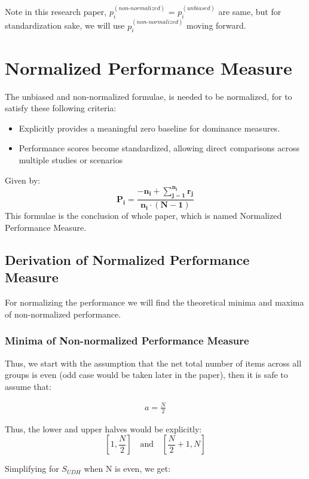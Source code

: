 \documentclass[man,floatsintext]{apa7}
\begin{document}
Note in this research paper, $p_i^{(non\text{-}normalized)}$ = $p_i^{(unbiased)}$ are same, but for standardization sake, we will use $p_i^{(non\text{-}normalized)}$ moving forward.

\section{Normalized Performance Measure}

The unbiased and non-normalized formulae, is needed to be normalized, for to satisfy these following criteria:
\begin{itemize}
	\item Explicitly provides a meaningful zero baseline for dominance measures.
	\item Performance scores become standardized, allowing direct comparisons across multiple studies or scenarios
\end{itemize}
Given by:
\begin{equation}
	\boxed{
		\mathbf{
			P_i = \frac{-n_i +  \sum\limits_{j=1}^{n_i} r_j}{n_i \cdot (N - 1)}}
	}
\end{equation}
This formulae is the conclusion of whole paper, which is named Normalized Performance Measure.

\subsection{Derivation of Normalized Performance Measure}

For normalizing the performance we will find the theoretical minima and maxima of non-normalized performance. 

\subsubsection{Minima of Non-normalized Performance Measure}

Thus, we start with the assumption that the net total number of items across all groups is even (odd case would be taken later in the paper), then it is safe to assume that:

\begin{align*}
	a = \frac{N}{2}
\end{align*}

Thus, the lower and upper halves would be explicitly:
\[
\left[1, \frac{N}{2}\right] \quad \text{and} \quad \left[\frac{N}{2}+1, N\right]
\]

Simplifying for $S_{UDH}$ when N is even, we get:
\end{document}
